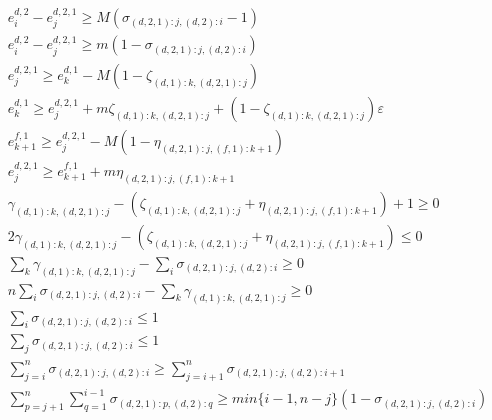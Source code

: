 \documentclass[]{interact}
\theoremstyle{plain}%
\theoremstyle{definition}
\theoremstyle{remark}
\begin{document}
\begin{eqnarray}
e^{d,2}_i-e^{d,2,1}_j\ge M(\sigma_{(d,2,1):j,(d,2):i}-1)\label{MergeErg:8.1}\\
e^{d,2}_i-e^{d,2,1}_j\ge m(1 - \sigma_{(d,2,1):j,(d,2):i})\\
e^{d,2,1}_{j} \ge e^{d,1}_{k} - M(1-\zeta_{(d,1):k,(d,2,1):j})\\ 
e^{d,1}_{k} \ge e^{d,2,1}_{j} + m\zeta_{(d,1):k,(d,2,1):j} +(1-\zeta_{(d,1):k,(d,2,1):j})\varepsilon\\ 
e^{f,1}_{k+1} \ge e^{d,2,1}_{j} - M(1-\eta_{(d,2,1):j,(f,1):k+1})\\
e^{d,2,1}_{j} \ge e^{f,1}_{k+1} + m\eta_{(d,2,1):j,(f,1):k+1}\\
\gamma_{(d,1):k,(d,2,1):j} - (\zeta_{(d,1):k,(d,2,1):j} + \eta_{(d,2,1):j,(f,1):k+1})+1\ge 0\\
2\gamma_{(d,1):k,(d,2,1):j}-(\zeta_{(d,1):k,(d,2,1):j} + \eta_{(d,2,1):j,(f,1):k+1})\le 0\\
\sum_k\gamma_{(d,1):k,(d,2,1):j}-\sum_i \sigma_{(d,2,1):j,(d,2):i} \ge 0\\
n\sum_{i}\sigma_{(d,2,1):j,(d,2):i} - \sum_k\gamma_{(d,1):k,(d,2,1):j}\ge 0\\
\sum_{i}\sigma_{(d,2,1):j,(d,2):i}\le 1\\
\sum_{j}\sigma_{(d,2,1):j,(d,2):i}\le 1\\
\sum_{j=i}^{n}\sigma_{(d,2,1):j,(d,2):i}\ge \sum_{j=i+1}^{n}\sigma_{(d,2,1):j,(d,2):i+1}\\
\sum_{p=j+1}^n\sum_{q=1}^{i-1} \sigma_{(d,2,1):p,(d,2):q} \ge min\{i-1,n-j\}(1-\sigma_{(d,2,1):j,(d,2):i})\label{MergeErg:8.2}
\end{eqnarray}
\end{document}
